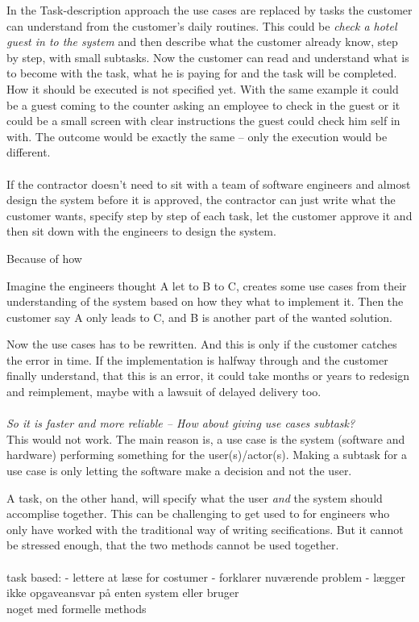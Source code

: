 \documentclass[Main]{subfiles}
\begin{document}
In the Task-description approach the use cases are replaced by tasks the customer can understand from the customer's daily routines.
This could be \textit{check a hotel guest in to the system} and then describe what the customer already know, step by step, with small subtasks.
Now the customer can read and understand what is to become with the task, what he is paying for and the task will be completed.
How it should be executed is not specified yet.
With the same example it could be a guest coming to the counter asking an employee to check in the guest or it could be a small screen with clear instructions the guest could check him self in with.
The outcome would be exactly the same -- only the execution would be different.
\\
\\
If the contractor doesn't need to sit with a team of software engineers and almost design the system before it is approved, the contractor can just write what the customer wants, specify step by step of each task, let the customer approve it and then sit down with the engineers to design the system.

Because of how 

Imagine the engineers thought A let to B to C, creates some use cases from their understanding of the system based on how they what to implement it. 
Then the customer say A only leads to C, and B is another part of the wanted solution.

Now the use cases has to be rewritten.
And this is only if the customer catches the error in time. 
If the implementation is halfway through and the customer finally understand, that this is an error, it could take months or years to redesign and reimplement, maybe with a lawsuit of delayed delivery too.
\\
\\
\textit{So it is faster and more reliable -- How about giving use cases subtask?}
\\
This would not work.
The main reason is, a use case is the system (software and hardware) performing something for the user(s)/actor(s).
Making a subtask for a use case is only letting the software make a decision and not the user.

A task, on the other hand, will specify what the user \textit{and} the system should accomplise together.
This can be challenging to get used to for engineers who only have worked with  the traditional way of writing secifications.
But it cannot be stressed enough, that the two methods cannot be used together.
\\ 
\\
task based:
- lettere at læse for costumer
- forklarer nuværende problem
- lægger ikke opgaveansvar på enten system eller bruger
\\

noget med formelle methods
\end{document}
